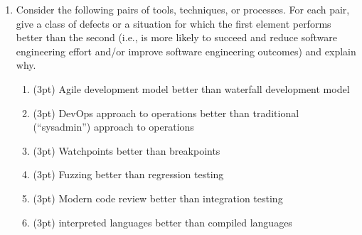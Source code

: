 \documentclass{report}
\newif\ifkey
\newcommand{\answerlong}[1]{\ifkey\color{red}\textbf{#1}\color{black}\else\vspace{0.5in}\fi\xspace}
\newcommand*{\pts}[1]{\addtocounter{points}{#1}(#1pt)}
\begin{document}
\begin{spacing}{1.4}
\begin{enumerate}[leftmargin=*]
    \item Consider the following pairs of tools, techniques, or processes. For each pair, give a class of defects or a
situation for which the first element performs better than the second (i.e., is more likely to succeed and reduce software
engineering effort and/or improve software engineering outcomes) and explain why.
\begin{enumerate}
\item \pts{3} Agile development model better than waterfall development model\\
  \answerlong{Agile is best when requirements are not fully known in advance and the customer is easy to access, because it relies on
    fast feedback cycles between your prototypes and the customer.}
\item \pts{3} DevOps approach to operations better than traditional (``sysadmin'') approach to operations\\
  \answerlong{DevOps is best when the organization developing a service is also running that service, becasue operational pain
    is felt by the same org.}
\item \pts{3} Watchpoints better than breakpoints \\
  \answerlong{Watchpoints are better when you know what value shouldn't be changing, but not where in the code that change is occuring.}
\item \pts{3} Fuzzing better than regression testing \\
  \answerlong{Fuzzing is better if the existing test suite is very small. Another reasonable answer is that fuzzing can find new bugs, but regression testing only prevents bug that have occurred before.}
\item \pts{3} Modern code review better than integration testing \\
  \answerlong{The easiest answer is that code review can find code-design defects, but integration testing cannot. Other answers are possible.}
\item \pts{3} interpreted languages better than compiled languages \\
  \answerlong{Interpreted languages are better for rapid prototyping and are usually easier to write code in.}
\end{enumerate}


\end{enumerate}
\end{spacing}
\end{document}
